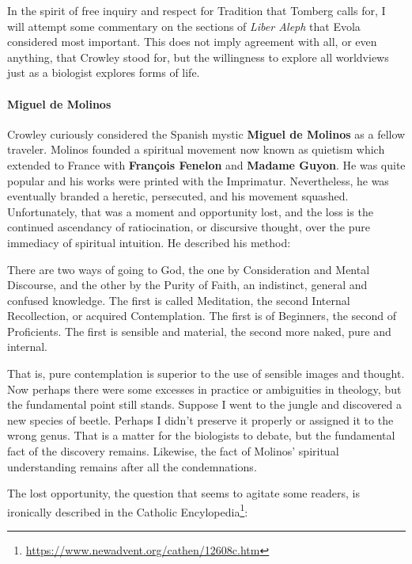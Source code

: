 In the spirit of free inquiry and respect for Tradition that Tomberg calls for, I will attempt some commentary on the sections of \emph{Liber Aleph} that Evola considered most important. This does not imply agreement with all, or even anything, that Crowley stood for, but the willingness to explore all worldviews just as a biologist explores forms of life.

\paragraph{Miguel de Molinos}
Crowley curiously considered the Spanish mystic \textbf{Miguel de Molinos} as a fellow traveler. Molinos founded a spiritual movement now known as quietism which extended to France with \textbf{François Fenelon} and \textbf{Madame Guyon}. He was quite popular and his works were printed with the Imprimatur. Nevertheless, he was eventually branded a heretic, persecuted, and his movement squashed. Unfortunately, that was a moment and opportunity lost, and the loss is the continued ascendancy of ratiocination, or discursive thought, over the pure immediacy of spiritual intuition. He described his method:

\begin{quotex}
There are two ways of going to God, the one by Consideration and Mental Discourse, and the other by the Purity of Faith, an indistinct, general and confused knowledge. The first is called Meditation, the second Internal Recollection, or acquired Contemplation. The first is of Beginners, the second of Proficients. The first is sensible and material, the second more naked, pure and internal. 

\end{quotex}
That is, pure contemplation is superior to the use of sensible images and thought. Now perhaps there were some excesses in practice or ambiguities in theology, but the fundamental point still stands. Suppose I went to the jungle and discovered a new species of beetle. Perhaps I didn't preserve it properly or assigned it to the wrong genus. That is a matter for the biologists to debate, but the fundamental fact of the discovery remains. Likewise, the fact of Molinos' spiritual understanding remains after all the condemnations.

The lost opportunity, the question that seems to agitate some readers, is ironically described in the Catholic Encylopedia\footnote{\url{https://www.newadvent.org/cathen/12608c.htm}}:


